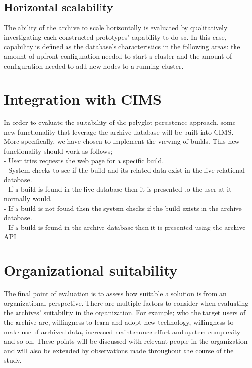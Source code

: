 \subsection{Horizontal scalability}
The ability of the archive to scale horizontally is evaluated by qualitatively investigating each constructed prototypes' capability to do so. In this case, capability is defined as the database's characteristics in the following areas: the amount of upfront configuration needed to start a cluster and the amount of configuration needed to add new nodes to a running cluster.

\section{Integration with CIMS}
In order to evaluate the suitability of the polyglot persistence approach, some new functionality that leverage the archive database will be built into CIMS. More specifically, we have chosen to implement the viewing of builds. This new functionality should work as follows; \\
- User tries requests the web page for a specific build. \\
- System checks to see if the build and its related data exist in the live relational database. \\
- If a build is found in the live database then it is presented to the user at it normally would. \\
- If a build is not found then the system checks if the build exists in the archive database. \\
- If a build is found in the archive database then it is presented using the archive API. \\

\section{Organizational suitability}
The final point of evaluation is to assess how suitable a solution is from an organizational perspective. There are multiple factors to consider when evaluating the archives' suitability in the organization. For example; who the target users of the archive are, willingness to learn and adopt new technology, willingness to make use of archived data, increased maintenance effort and system complexity and so on. These points will be discussed with relevant people in the organization and will also be extended by observations made throughout the course of the study.

